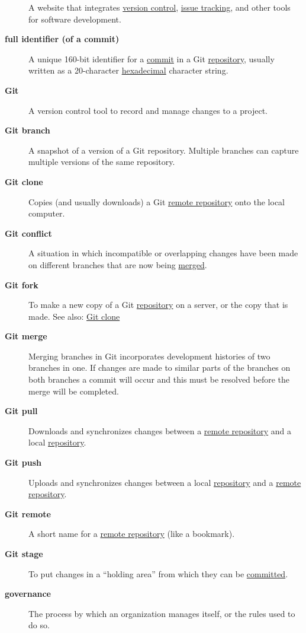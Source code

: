 \documentclass[
]{krantz}
\begin{document}
\begin{description}
A website that integrates \protect\hyperlink{version_control}{version control}, \protect\hyperlink{issue_tracking_system}{issue tracking}, and other tools for software development.
\item[\textbf{full identifier (of a commit)}]
A unique 160-bit identifier for a \protect\hyperlink{commit}{commit} in a Git \protect\hyperlink{repository}{repository}, usually written as a 20-character \protect\hyperlink{hexadecimal}{hexadecimal} character string.
\item[\textbf{Git}]
A version control tool to record and manage changes to a project.
\item[\textbf{Git branch}]
A snapshot of a version of a Git repository. Multiple branches can capture multiple versions of the same repository.
\item[\textbf{Git clone}]
Copies (and usually downloads) a Git \protect\hyperlink{remote_repository}{remote repository} onto the local computer.
\item[\textbf{Git conflict}]
A situation in which incompatible or overlapping changes have been made on different branches that are now being \protect\hyperlink{git_merge}{merged}.
\item[\textbf{Git fork}]
To make a new copy of a Git \protect\hyperlink{repository}{repository} on a server, or the copy that is made. See also: \protect\hyperlink{git_clone}{Git clone}
\item[\textbf{Git merge}]
Merging branches in Git incorporates development histories of two branches in one. If changes are made to similar parts of the branches on both branches a commit will occur and this must be resolved before the merge will be completed.
\item[\textbf{Git pull}]
Downloads and synchronizes changes between a \protect\hyperlink{remote_repository}{remote repository} and a local \protect\hyperlink{repository}{repository}.
\item[\textbf{Git push}]
Uploads and synchronizes changes between a local \protect\hyperlink{repository}{repository} and a \protect\hyperlink{remote_repository}{remote repository}.
\item[\textbf{Git remote}]
A short name for a \protect\hyperlink{remote_repository}{remote repository} (like a bookmark).
\item[\textbf{Git stage}]
To put changes in a ``holding area'' from which they can be \protect\hyperlink{commit}{committed}.
\item[\textbf{governance}]
The process by which an organization manages itself, or the rules used to do so.

\end{description}
\end{document}
